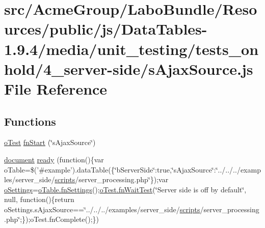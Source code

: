 \hypertarget{4__server-side_2s_ajax_source_8js}{\section{src/\+Acme\+Group/\+Labo\+Bundle/\+Resources/public/js/\+Data\+Tables-\/1.9.4/media/unit\+\_\+testing/tests\+\_\+onhold/4\+\_\+server-\/side/s\+Ajax\+Source.js File Reference}
\label{4__server-side_2s_ajax_source_8js}
}
\subsection*{Functions}
\begin{DoxyCompactItemize}
\item 
\hyperlink{unit__test_8js_a3b2d259e2df3b6860d9047a92d09d0d6}{o\+Test} \hyperlink{4__server-side_2s_ajax_source_8js_ac9763cc94ec0c808a487a17695a03ab9}{fn\+Start} (\char`\"{}s\+Ajax\+Source\char`\"{})
\item 
\hyperlink{outside_events_8js_aa14f8e0338cced6720590fd2ea13bd4b}{document} \hyperlink{4__server-side_2s_ajax_source_8js_aec099dd0375734bf20f3c9510d94c8e2}{ready} (function()\{var o\+Table=\$('\#example').data\+Table(\{\char`\"{}b\+Server\+Side\char`\"{}\+:true,\char`\"{}s\+Ajax\+Source\char`\"{}\+:\char`\"{}../../../examples/server\+\_\+side/\hyperlink{tinymce_8jquery_8dev_8js_a09066d4d580eeec222f858d588b4cdef}{scripts}/server\+\_\+processing.\+php\char`\"{}\});var \hyperlink{model_8settings_8js_a4857b9c813b4dea010668e9555d0aca7}{o\+Settings}=\hyperlink{api_8methods_8js_a78f387fab92a85c2cb7830bc5d8a6141}{o\+Table.\+fn\+Settings}();\hyperlink{onhold_24__server-side_2__zero__config_8js_ab25c4d596771c0133cdc45178ce72c3d}{o\+Test.\+fn\+Wait\+Test}(\char`\"{}Server side is off by default\char`\"{}, null, function()\{return o\+Settings.\+s\+Ajax\+Source==\char`\"{}../../../examples/server\+\_\+side/\hyperlink{tinymce_8jquery_8dev_8js_a09066d4d580eeec222f858d588b4cdef}{scripts}/server\+\_\+processing.\+php\char`\"{};\});o\+Test.\+fn\+Complete();\})
\end{DoxyCompactItemize}


